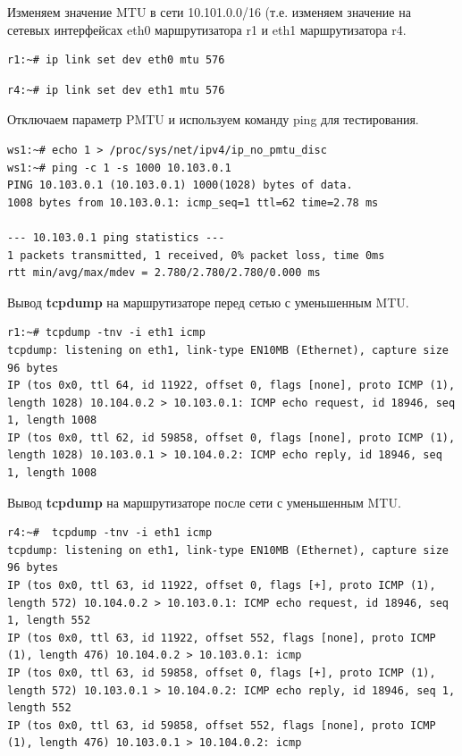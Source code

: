 \documentclass[a4paper,12pt]{article}
\begin{document}
Изменяем значение MTU в сети 10.101.0.0/16 (т.е. изменяем значение на сетевых интерфейсах eth0 маршрутизатора r1 и eth1 маршрутизатора r4. 

\begin{Verbatim}
r1:~# ip link set dev eth0 mtu 576
\end{Verbatim}

\begin{Verbatim}
r4:~# ip link set dev eth1 mtu 576
\end{Verbatim}


Отключаем параметр PMTU и используем команду ping для тестирования.

\begin{Verbatim}
ws1:~# echo 1 > /proc/sys/net/ipv4/ip_no_pmtu_disc
ws1:~# ping -c 1 -s 1000 10.103.0.1
PING 10.103.0.1 (10.103.0.1) 1000(1028) bytes of data.
1008 bytes from 10.103.0.1: icmp_seq=1 ttl=62 time=2.78 ms

--- 10.103.0.1 ping statistics ---
1 packets transmitted, 1 received, 0% packet loss, time 0ms
rtt min/avg/max/mdev = 2.780/2.780/2.780/0.000 ms
\end{Verbatim}

Вывод \textbf{tcpdump} на маршрутизаторе перед сетью с уменьшенным MTU.


\begin{Verbatim}
r1:~# tcpdump -tnv -i eth1 icmp
tcpdump: listening on eth1, link-type EN10MB (Ethernet), capture size 96 bytes
IP (tos 0x0, ttl 64, id 11922, offset 0, flags [none], proto ICMP (1), length 1028) 10.104.0.2 > 10.103.0.1: ICMP echo request, id 18946, seq 1, length 1008
IP (tos 0x0, ttl 62, id 59858, offset 0, flags [none], proto ICMP (1), length 1028) 10.103.0.1 > 10.104.0.2: ICMP echo reply, id 18946, seq 1, length 1008
\end{Verbatim}

Вывод \textbf{tcpdump} на маршрутизаторе после сети с уменьшенным MTU.


\begin{Verbatim}
r4:~#  tcpdump -tnv -i eth1 icmp
tcpdump: listening on eth1, link-type EN10MB (Ethernet), capture size 96 bytes
IP (tos 0x0, ttl 63, id 11922, offset 0, flags [+], proto ICMP (1), length 572) 10.104.0.2 > 10.103.0.1: ICMP echo request, id 18946, seq 1, length 552
IP (tos 0x0, ttl 63, id 11922, offset 552, flags [none], proto ICMP (1), length 476) 10.104.0.2 > 10.103.0.1: icmp
IP (tos 0x0, ttl 63, id 59858, offset 0, flags [+], proto ICMP (1), length 572) 10.103.0.1 > 10.104.0.2: ICMP echo reply, id 18946, seq 1, length 552
IP (tos 0x0, ttl 63, id 59858, offset 552, flags [none], proto ICMP (1), length 476) 10.103.0.1 > 10.104.0.2: icmp
\end{Verbatim}
\end{document}

